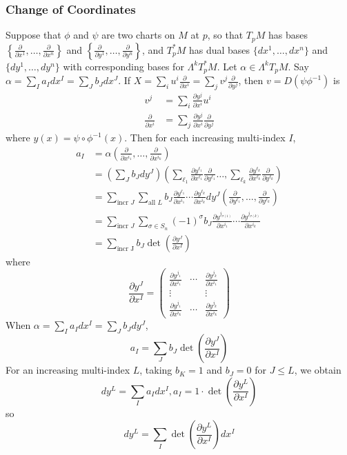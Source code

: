 \documentclass[11pt, a4paper]{memoir}
\theoremstyle{change}
\theoremstyle{plain}
\theoremstyle{nonumberplain}
\newcommand{\prt}[2]{\ensuremath{\frac{\partial #1}{\partial #2}}}
\numberwithin{equation}{section}
\begin{document}
\subsubsection{Change of Coordinates}
Suppose that $\phi$ and $\psi$ are two charts on $M$ at $p$, so that $T_pM$ has bases $\left\{\prt{}{x^1},\ldots,\prt{}{x^n}\right\}$ and $\left\{\prt{}{y^1},\ldots,\prt{}{y^n}\right\}$, and $T_p^*M$ has dual bases $\{dx^1,\ldots,dx^n\}$ and $\{dy^1,\ldots,dy^n\}$ with corresponding bases for $\Lambda^kT_p^*M$.
Let $\alpha\in\Lambda^kT_pM$.
Say $\alpha=\sum_I a_Idx^I=\sum_Jb_Jdx^J$.
If $X=\sum_iu^i\prt{}{x^i}=\sum_jv^j\prt{}{y^j}$, then $v=D(\psi\phi^{-1})$ is
\begin{align*}
    v^j &= \sum_i\prt{y^j}{x^i}u^i\\
    \prt{}{x^i} &= \sum_j\prt{y^j}{x^i}\prt{}{y^j}
\end{align*}
where $y(x)=\psi\circ\phi^{-1}(x)$.
Then for each increasing multi-index $I$,
\begin{align*}
    a_I &= \alpha\left(\prt{}{x^{i_1}},\ldots,\prt{}{x^{i_k}}\right)\\
        &= \left(\sum_J b_J dy^J\right)\left(\sum_{\ell_1}\prt{y^{\ell_1}}{x^{\ell_1}}\prt{}{y^{\ell_1}}\ldots,\sum_{\ell_k}\prt{y^{\ell_k}}{x^{\ell_k}}\prt{}{y^{\ell_k}}\right)\\
        &= \sum_{\text{incr }J}\sum_{\text{all }L}b_J\prt{y^{\ell_1}}{x^{i_1}}\cdots\prt{y^{\ell_k}}{x^{i_k}}dy^J\left(\prt{}{y^{\ell_1}},\ldots,\prt{}{y^{\ell_k}}\right)\\
        &= \sum_{\text{incr }J}\sum_{\sigma\in S_n}(-1)^\sigma b_J\prt{y^{j_{\sigma(1)}}}{x^{i_1}}\cdots\prt{y^{j_{\sigma(k)}}}{x^{i_k}}\\
        &= \sum_{\text{incr J}}b_J\det\left(\prt{y^J}{x^I}\right)
\end{align*}
where
\begin{equation*}
    \prt{y^J}{x^I}=
    \begin{pmatrix}
        \prt{y^{j_1}}{x^{i_1}}&\cdots& \prt{y^{j_k}}{x^{i_1}}\\
        \vdots&&\vdots\\
        \prt{y^{j_1}}{x^{i_k}}&\cdots& \prt{y^{j_k}}{x^{i_k}}
    \end{pmatrix}
\end{equation*}
When $\alpha=\sum_Ia_Idx^I=\sum_Jb_Jdy^J$,
\begin{equation*}
    a_I=\sum_Jb_J\det\left(\prt{y^J}{x^I}\right)
\end{equation*}
For an increasing multi-index $L$, taking $b_K=1$ and $b_J=0$ for $J\leq L$, we obtain
\begin{equation*}
    dy^L=\sum_Ia_Idx^I,a_I=1\cdot\det\left(\prt{y^L}{x^I}\right)
\end{equation*}
so
\begin{equation*}
    dy^L = \sum_I\det\left(\prt{y^L}{x^I}\right)dx^I
\end{equation*}
\end{document}
